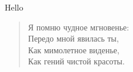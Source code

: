 \documentclass{article}
\begin{document}
Hello

\begin{quote}
  Я помню чудное мгновенье:\\
  Передо мной явилась ты,\\
  Как мимолетное виденье,\\
  Как гений чистой красоты.
\end{quote}
\end{document}
